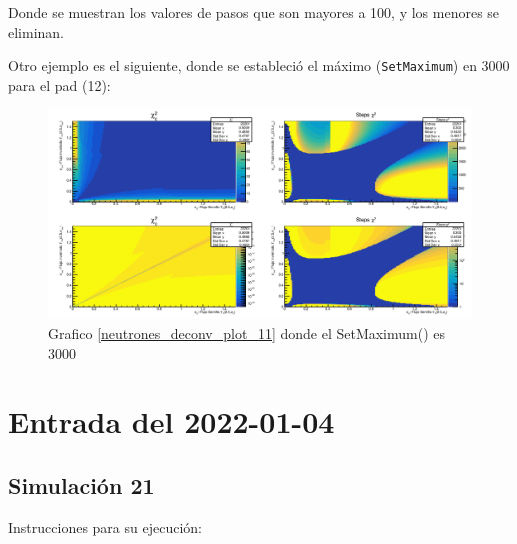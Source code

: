 \documentclass[11pt,letterpaper]{article}
\begin{document}
Donde se muestran los valores de pasos que son mayores a 100, y los menores se eliminan.

Otro ejemplo es el siguiente, donde se estableció el máximo (\verb|SetMaximum|) en 3000 para el pad (12):

\begin{figure}[H]
    \includegraphics[width=1.\textwidth]{img/chi2_test_1-149_fluxseed_G_fluxinv_G_11_SetMaximum3e3.png}
    \centering
     \cprotect\caption{Grafico \ref{neutrones_deconv_plot_11} donde el SetMaximum() es 3000} 
\label{neutrones_deconv_plot_11_SetMaximum3000}
\end{figure}

\section{Entrada del 2022-01-04}
\label{2022-01-04}

\subsection*{Simulación 21}

Instrucciones para su ejecución:
\end{document}
